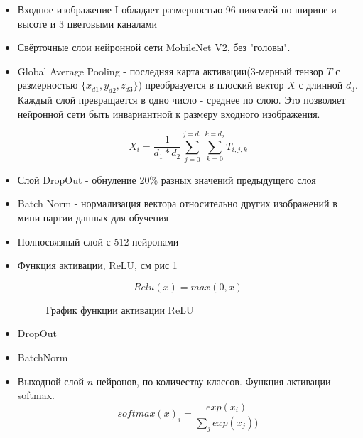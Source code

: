 \begin{itemize}
    \item Входное изображение I обладает размерностью 96 пикселей по ширине и высоте и 3 цветовыми каналами
    \item Свёрточные слои нейронной сети MobileNet V2\cite{mobilenet}, без "головы".
    \item Global Average Pooling - последняя карта активации(3-мерный тензор $T$ с размерностью $\{x_{d1}, y_{d2}, z_{d3}\}$) преобразуется в плоский вектор $X$ с длинной $d_3$. Каждый слой превращается в одно число - среднее по слою. Это позволяет нейронной сети быть инвариантной к размеру входного изображения.
    
    \[ X_i = \dfrac{1}{d_1*d_2}\sum_{j=0}^{j=d_1}\sum_{k=0}^{k=d_2}T_{i,j,k} \]
    
    \item Слой DropOut\cite{dropout} - обнуление 20\% разных значений предыдущего слоя
    \item Batch Norm\cite{batchnorm} - нормализация вектора относительно других изображений в мини-партии данных для обучения
    \item Полносвязный слой с 512 нейронами
    \item Функция активации, ReLU, см рис \ref{fig:relu}
    
    \[ Relu(x) = max(0,x) \]
    
    
    \begin{figure}
        \centering
        \caption{График функции активации ReLU}
        \label{fig:relu}
    \end{figure}
    
    \item DropOut
    \item BatchNorm
    \item Выходной слой $n$ нейронов, по количеству классов. Функция активации softmax. 
    \[softmax(x)_i = \frac{exp(x_i)}{\sum_{j}^{ }exp(x_j))}\]
\end{itemize}

